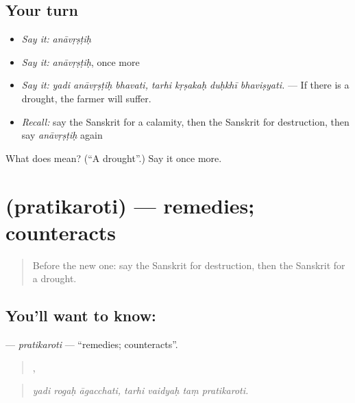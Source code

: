 \subsection*{Your turn}
\begin{itemize}
\raggedright
  \item \emph{Say it:} \emph{anāvṛṣṭiḥ}
  \item \emph{Say it:} \emph{anāvṛṣṭiḥ}, once more
  \item \emph{Say it:} \emph{yadi anāvṛṣṭiḥ bhavati, tarhi kṛṣakaḥ duḥkhī bhaviṣyati.} — If there is a drought, the farmer will suffer.
  \item \emph{Recall:} say the Sanskrit for a calamity, then the Sanskrit for destruction, then say \emph{anāvṛṣṭiḥ} again
\end{itemize}

\begin{tcolorbox}[breakable,colback=teal!4,colframe=teal!35!black,title={Before you move on}]
What does  mean? (\textquotedblleft{}A drought\textquotedblright{}.) Say it once more.
\end{tcolorbox}
\section[\texorpdfstring{\sk{प्रतिकरोति} (pratikaroti)}{प्रतिकरोति (pratikaroti)}]{ (pratikaroti) — remedies; counteracts}

\label{lesson:SA-C375-pratikaroti}



\begin{quote}
Before the new one: say the Sanskrit for destruction, then the Sanskrit for a drought.
\end{quote}

\subsection*{You'll want to know: }
\textbf{} — \emph{pratikaroti} — \textquotedblleft{}remedies; counteracts\textquotedblright{}.

\begin{quote}
  ,    
\end{quote}

\begin{quote}
\emph{yadi rogaḥ āgacchati, tarhi vaidyaḥ taṃ pratikaroti.}
\end{quote}

